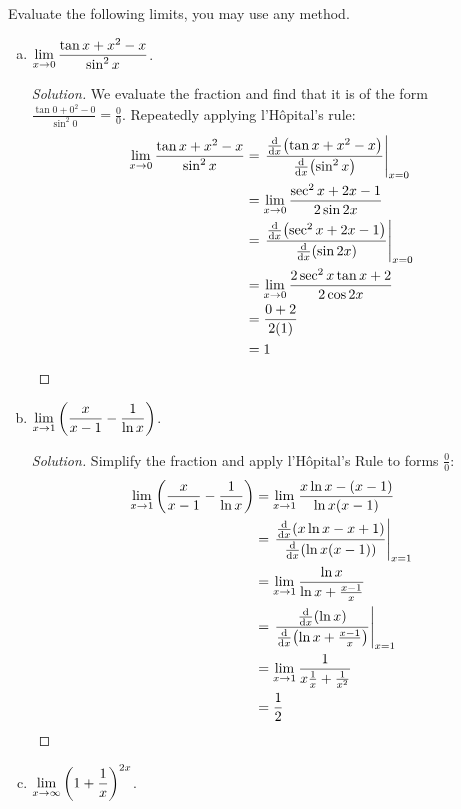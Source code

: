 \question Evaluate the following limits, you may use any method.
\begin{enumerate}[(a)]
  \item $\displaystyle\lim_{x\to0}\frac{\tan x + x^2 - x}{\sin^2 x}$.
        \begin{proof}[Solution]
          We evaluate the fraction and find that it is of the form
          $\frac{\tan 0+0^2-0}{\sin^2 0}=\frac{0}{0}$.
          Repeatedly applying l'Hôpital's rule:
          \begin{align*}
            \lim_{x\to0} \frac{\tan x + x^2 - x}{\sin^2 x}
             & = \left.\frac{\dv{x}(\tan x + x^2 - x)}{\dv{x}(\sin^2 x)}\right|_{x=0} \\
             & = \lim_{x\to0} \frac{\sec^2 x + 2x - 1}{2\sin 2x}             \\
             & = \left.\frac{\dv{x}(\sec^2 x + 2x - 1)}{\dv{x}(\sin 2x)}\right|_{x=0} \\
             & = \lim_{x\to0} \frac{2\sec^2 x \tan x + 2}{2\cos 2x}          \\
             & = \frac{0 + 2}{2(1)}                                          \\
             & = 1 \qedhere
          \end{align*}
        \end{proof}
  \item $\displaystyle\lim_{x\to1}\left(\frac{x}{x-1} - \frac{1}{\ln x}\right)$.
        \begin{proof}[Solution]
          Simplify the fraction and apply l'Hôpital's Rule to forms $\frac{0}{0}$:
          \begin{align*}
            \lim_{x\to1} \left(\frac{x}{x-1} - \frac{1}{\ln x}\right)
             & = \lim_{x\to1} \frac{x \ln x - (x-1)}{\ln x(x-1)}               \\
             & = \left.\frac{\dv{x}(x \ln x - x+1)}{\dv{x}(\ln x(x-1))}\right|_{x=1}    \\
             & = \lim_{x\to1} \frac{\ln x}{\ln x + \frac{x-1}{x}}              \\
             & = \left.\frac{\dv{x}(\ln x)}{\dv{x}(\ln x + \frac{x-1}{x})}\right|_{x=1} \\
             & = \lim_{x\to1} \frac{1}{x\frac{1}{x} + \frac{1}{x^2}}           \\
             & = \frac{1}{2} \qedhere
          \end{align*}
        \end{proof}
  \item $\displaystyle\lim_{x\to\infty}\left(1 + \frac{1}{x}\right)^{2x}$.

\end{enumerate}
